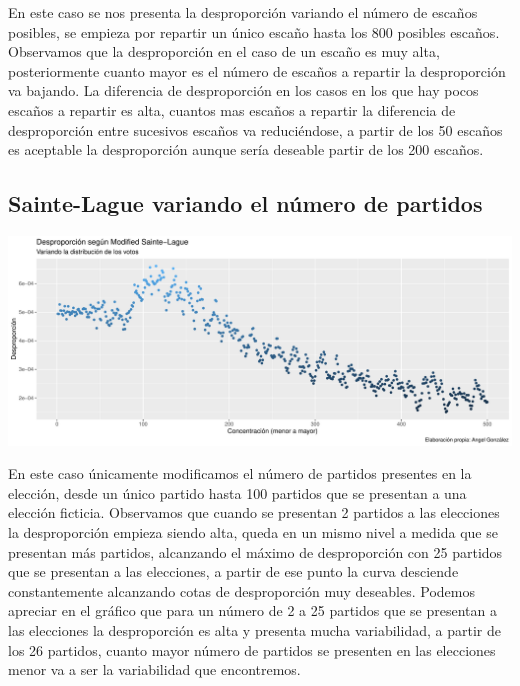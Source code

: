 \documentclass[12pt,a4paper,]{book}
\numberwithin{dummy}{section}
\theoremstyle{ocrenumbox}
\theoremstyle{blacknumex}
\theoremstyle{blacknumbox}
\theoremstyle{ocrenum}
\theoremstyle{ocrenum}
\begin{document}
En este caso se nos presenta la desproporción variando el número de
escaños posibles, se empieza por repartir un único escaño hasta los 800
posibles escaños. Observamos que la desproporción en el caso de un
escaño es muy alta, posteriormente cuanto mayor es el número de escaños
a repartir la desproporción va bajando. La diferencia de desproporción
en los casos en los que hay pocos escaños a repartir es alta, cuantos
mas escaños a repartir la diferencia de desproporción entre sucesivos
escaños va reduciéndose, a partir de los 50 escaños es aceptable la
desproporción aunque sería deseable partir de los 200 escaños.

\hypertarget{sainte-lague-variando-el-nuxfamero-de-partidos}{%
\subsection{Sainte-Lague variando el número de
partidos}\label{sainte-lague-variando-el-nuxfamero-de-partidos}}

\begin{center}\includegraphics[width=0.95\linewidth]{figurasR/unnamed-chunk-24-1} \end{center}

En este caso únicamente modificamos el número de partidos presentes en
la elección, desde un único partido hasta 100 partidos que se presentan
a una elección ficticia. Observamos que cuando se presentan 2 partidos a
las elecciones la desproporción empieza siendo alta, queda en un mismo
nivel a medida que se presentan más partidos, alcanzando el máximo de
desproporción con 25 partidos que se presentan a las elecciones, a
partir de ese punto la curva desciende constantemente alcanzando cotas
de desproporción muy deseables. Podemos apreciar en el gráfico que para
un número de 2 a 25 partidos que se presentan a las elecciones la
desproporción es alta y presenta mucha variabilidad, a partir de los 26
partidos, cuanto mayor número de partidos se presenten en las elecciones
menor va a ser la variabilidad que encontremos.
\end{document}
